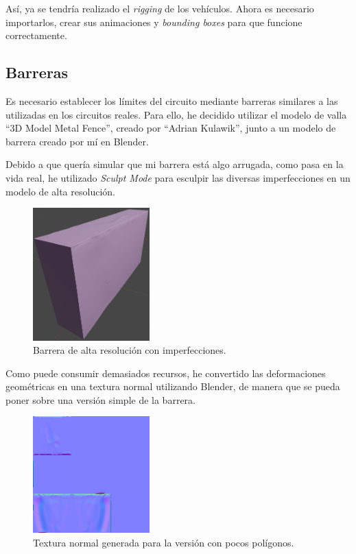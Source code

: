 Así, ya se tendría realizado el \textit{rigging} de los vehículos. Ahora es necesario importarlos, crear sus animaciones y \textit{bounding boxes} para que funcione correctamente.

\newpage

\subsection{Barreras}

Es necesario establecer los límites del circuito mediante barreras similares a las utilizadas en los circuitos reales. Para ello, he decidido utilizar el modelo de valla ``3D Model Metal Fence''\cite{fence}, creado por ``Adrian Kulawik'', junto a un modelo de barrera creado por mí en Blender.

\bigskip

Debido a que quería simular que mi barrera está algo arrugada, como pasa en la vida real, he utilizado \textit{Sculpt Mode} para esculpir las diversas imperfecciones en un modelo de alta resolución. 

\begin{figure}[H]
    \centering
    \includegraphics[width=0.4\textwidth]{imagenes/converted/barrier/barrierHP.jpg}
    \caption{Barrera de alta resolución con imperfecciones.}
    \label{fig:barreraHP}
\end{figure}

Como puede consumir demasiados recursos, he convertido las deformaciones geométricas en una textura normal utilizando Blender, de manera que se pueda poner sobre una versión simple de la barrera.

\begin{figure}[H]
    \centering
    \includegraphics[width=0.4\textwidth]{imagenes/converted/barrier/barrierNormal.jpg}
    \caption{Textura normal generada para la versión con pocos polígonos.}
    \label{fig:barreraLP}
\end{figure}


